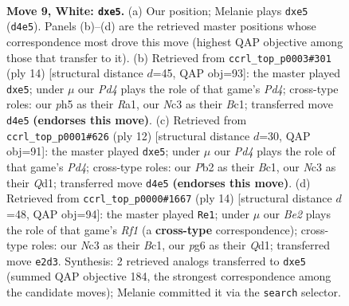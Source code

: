 \documentclass[11pt]{article}
\begin{document}
\clearpage

\begin{figure}[p]\centering
\begin{subfigure}{0.46\textwidth}\centering
\resizebox{\linewidth}{!}{%
\newchessgame
\chessboard[
  setfen={rnbq1rk1/pp3pb1/2pp1np1/4p2p/3PP3/2N2N2/PPP1BPPP/R1BQRK2 w - - 0 9},
  showmover=false,
  pgfstyle=straightmove, color=movearrow, markmove={d4-e5}
]}
\caption{}
\end{subfigure}\hfill
\begin{subfigure}{0.46\textwidth}\centering
\resizebox{\linewidth}{!}{%
\newchessgame
\chessboard[
  setfen={rnbq1rk1/1pp2pbp/p2p1np1/4p3/2PPP3/2N2N2/PP2BPPP/R1BQ1RK1 w - - 0 8},
  showmover=false,
  pgfstyle=straightmove, color=movearrow, markmove={d4-e5}
]}
\caption{}
\end{subfigure}
\\[4pt]
\begin{subfigure}{0.46\textwidth}\centering
\resizebox{\linewidth}{!}{%
\newchessgame
\chessboard[
  setfen={rnbq1rk1/ppp2pbp/3p1np1/4p3/3PP3/2N2N2/PPP1BPPP/R1BQ1RK1 w - - 0 7},
  showmover=false,
  pgfstyle=straightmove, color=movearrow, markmove={d4-e5}
]}
\caption{}
\end{subfigure}\hfill
\begin{subfigure}{0.46\textwidth}\centering
\resizebox{\linewidth}{!}{%
\newchessgame
\chessboard[
  setfen={r1bq1rk1/ppp2pbp/n2p1np1/4p3/2PPP3/2N2N2/PP2BPPP/R1BQ1RK1 w - - 2 8},
  showmover=false,
  pgfstyle=straightmove, color=movearrow, markmove={f1-e1}
]}
\caption{}
\end{subfigure}
\caption{\textbf{Move 9, White: \texttt{dxe5}.} (a) Our position; Melanie plays \texttt{dxe5} (\texttt{d4e5}). Panels (b)--(d) are the retrieved master positions whose correspondence most drove this move (highest QAP objective among those that transfer to it). (b) Retrieved from \texttt{ccrl\_top\_p0003\#301} (ply 14) [structural distance $d$=45, QAP obj=93]: the master played \texttt{dxe5}; under $\mu$ our \emph{Pd4} plays the role of that game's \emph{Pd4}; cross-type roles: our \emph{p}h5 as their \emph{R}a1, our \emph{N}c3 as their \emph{B}c1; transferred move \texttt{d4e5} \textbf{(endorses this move)}. (c) Retrieved from \texttt{ccrl\_top\_p0001\#626} (ply 12) [structural distance $d$=30, QAP obj=91]: the master played \texttt{dxe5}; under $\mu$ our \emph{Pd4} plays the role of that game's \emph{Pd4}; cross-type roles: our \emph{P}b2 as their \emph{B}c1, our \emph{N}c3 as their \emph{Q}d1; transferred move \texttt{d4e5} \textbf{(endorses this move)}. (d) Retrieved from \texttt{ccrl\_top\_p0000\#1667} (ply 14) [structural distance $d$=48, QAP obj=94]: the master played \texttt{Re1}; under $\mu$ our \emph{Be2} plays the role of that game's \emph{Rf1} (a \textbf{cross-type} correspondence); cross-type roles: our \emph{N}c3 as their \emph{B}c1, our \emph{p}g6 as their \emph{Q}d1; transferred move \texttt{e2d3}. Synthesis: 2 retrieved analogs transferred to \texttt{dxe5} (summed QAP objective 184, the strongest correspondence among the candidate moves); Melanie committed it via the \texttt{search} selector.}
\label{fig:thought-m16}
\end{figure}
\end{document}
